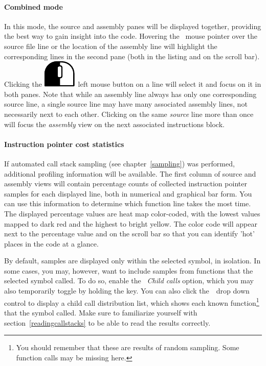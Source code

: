 \documentclass[hidelinks,titlepage,a4paper]{article}
\newcommand{\LMB}{\includegraphics[height=.8\baselineskip]{icons/lmb}}
\begin{document}
\paragraph{Combined mode}

In this mode, the source and assembly panes will be displayed together, providing the best way to gain insight into the code. Hovering the \faMousePointer{}~mouse pointer over the source file line or the location of the assembly line will highlight the corresponding lines in the second pane (both in the listing and on the scroll bar). Clicking the \LMB{}~left mouse button on a line will select it and focus on it in both panes. Note that while an assembly line always has only one corresponding source line, a single source line may have many associated assembly lines, not necessarily next to each other. Clicking on the same \emph{source} line more than once will focus the \emph{assembly} view on the next associated instructions block.

\paragraph{Instruction pointer cost statistics}

If automated call stack sampling (see chapter~\ref{sampling}) was performed, additional profiling information will be available. The first column of source and assembly views will contain percentage counts of collected instruction pointer samples for each displayed line, both in numerical and graphical bar form. You can use this information to determine which function line takes the most time. The displayed percentage values are heat map color-coded, with the lowest values mapped to dark red and the highest to bright yellow. The color code will appear next to the percentage value and on the scroll bar so that you can identify 'hot' places in the code at a glance.

By default, samples are displayed only within the selected symbol, in isolation. In some cases, you may, however, want to include samples from functions that the selected symbol called. To do so, enable the \emph{\faSignOut*{}~Child calls} option, which you may also temporarily toggle by holding the  key. You can also click the~\faCaretDown{}~drop down control to display a child call distribution list, which shows each known function\footnote{You should remember that these are results of random sampling. Some function calls may be missing here.} that the symbol called. Make sure to familiarize yourself with section~\ref{readingcallstacks} to be able to read the results correctly.
\end{document}
